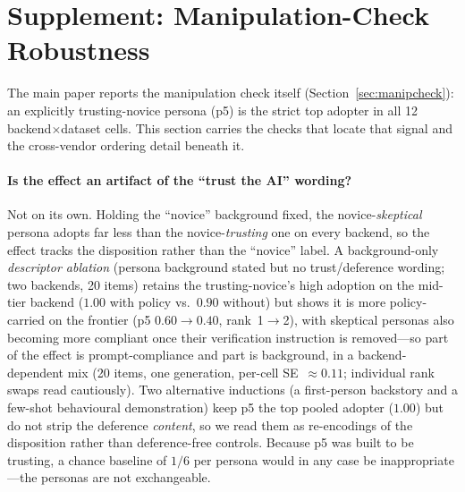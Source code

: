 \documentclass[manuscript,review,anonymous]{acmart}
\begin{document}
\section{Supplement: Manipulation-Check Robustness}
\label{app:manip}

The main paper reports the manipulation check itself (Section~\ref{sec:manipcheck}): an explicitly
trusting-novice persona (p5) is the strict top adopter in all 12 backend$\times$dataset cells. This section
carries the checks that locate that signal and the cross-vendor ordering detail beneath it.

\paragraph{Is the effect an artifact of the ``trust the AI'' wording?} Not on its own. Holding the
``novice'' background fixed, the novice-\emph{skeptical} persona adopts far less than the
novice-\emph{trusting} one on every backend, so the effect tracks the disposition rather than the
``novice'' label. A background-only \emph{descriptor ablation} (persona background stated but no
trust/deference wording; two backends, 20 items) retains the trusting-novice's high adoption on the
mid-tier backend ($1.00$ with policy vs.\ $0.90$ without) but shows it is more policy-carried on the
frontier (p5 $0.60\to0.40$, rank~1$\to$2), with skeptical personas also becoming more compliant once their
verification instruction is removed---so part of the effect is prompt-compliance and part is background, in
a backend-dependent mix (20 items, one generation, per-cell SE~$\approx0.11$; individual rank swaps read
cautiously). Two alternative inductions (a first-person backstory and a few-shot behavioural demonstration)
keep p5 the top pooled adopter ($1.00$) but do not strip the deference \emph{content}, so we read them as
re-encodings of the disposition rather than deference-free controls. Because p5 was built to be trusting, a
chance baseline of $1/6$ per persona would in any case be inappropriate---the personas are not
exchangeable.
\end{document}
